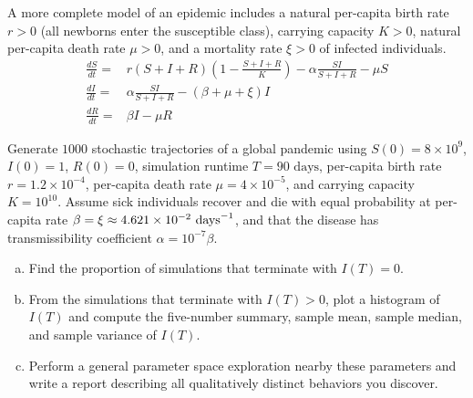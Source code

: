 \begin{exercises}
\item \label{ex:hw_sir_pandemic}
A more complete model of an epidemic includes a natural per-capita birth rate $r > 0$ (all newborns enter the susceptible class), carrying capacity $K > 0$, natural per-capita death rate $\mu > 0$, and a mortality rate $\xi > 0$ of infected individuals.
\begin{align*}
\frac{dS}{dt} =& r(S+I+R)(1-\frac{S+I+R}{K}) - \alpha \frac{SI}{S+I+R} - \mu S\\
\frac{dI}{dt} =& \alpha \frac{SI}{S+I+R} - (\beta + \mu + \xi) I\\
\frac{dR}{dt} =& \beta I - \mu R
\end{align*}
\begin{sloppypar}
Generate $1000$ stochastic trajectories of a global pandemic using $S(0) = 8 \times 10^9$, $I(0) = 1$, $R(0) = 0$, simulation runtime $T = 90\text{ days}$, per-capita birth rate $r = 1.2 \times 10^{-4}$, per-capita death rate $\mu = 4\times10^{-5}$, and carrying capacity $K = 10^{10}$. Assume sick individuals recover and die with equal probability at per-capita rate $\beta = \xi \approx 4.621 \times 10^{-2}\textup{ days}^{-1}$, and that the disease has transmissibility coefficient $\alpha = 10^{-7}\beta$.
\end{sloppypar}
\begin{enumerate}[(a)]
\item Find the proportion of simulations that terminate with $I(T) = 0$.
\item From the simulations that terminate with $I(T) > 0$, plot a histogram of $I(T)$ and compute the five-number summary, sample mean, sample median, and sample variance of $I(T)$.
\item Perform a general parameter space exploration nearby these parameters and write a report describing all qualitatively distinct behaviors you discover.
\end{enumerate}



\end{exercises}
